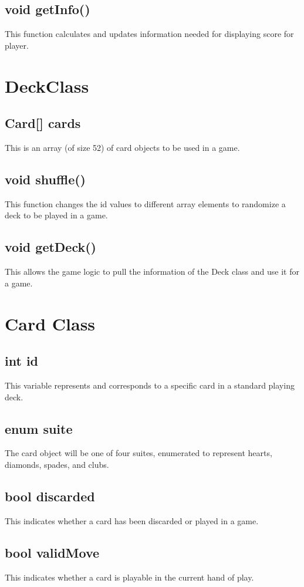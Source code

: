\documentclass[]{scrartcl}
\begin{document}
\subsection{void getInfo()}
	This function calculates and updates information needed for displaying score for player.

\section{DeckClass}

\subsection{Card[] cards}
	This is an array (of size 52) of card objects to be used in a game.
\subsection{void shuffle()}
	This function changes the id values to different array elements to randomize a deck to be played in a game.
\subsection{void getDeck()}
	This allows the game logic to pull the information of the Deck class and use it for a game.
\section{Card Class}

\subsection{int id}
	This variable represents and corresponds to a specific card in a standard playing deck.
\subsection{enum suite}
	The card object will be one of four suites, enumerated to represent hearts, diamonds, spades, and clubs.
\subsection{bool discarded}
	This indicates whether a card has been discarded or played in a game.
\subsection{bool validMove}
	This indicates whether a card is playable in the current hand of play.
\end{document}
